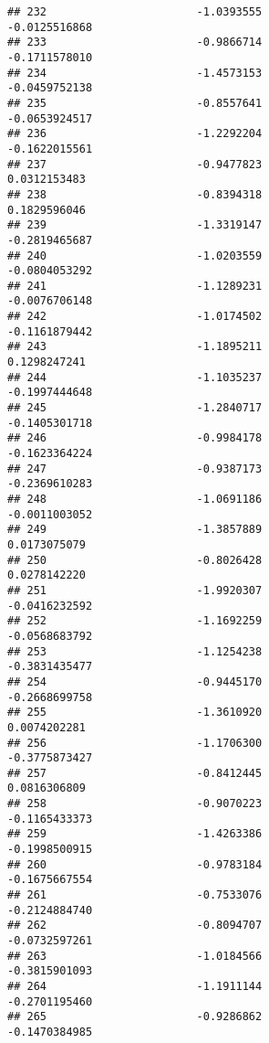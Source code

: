 \documentclass[
]{article}
\begin{document}
\begin{verbatim}
## 232                       -1.0393555                         -0.0125516868
## 233                       -0.9866714                         -0.1711578010
## 234                       -1.4573153                         -0.0459752138
## 235                       -0.8557641                         -0.0653924517
## 236                       -1.2292204                         -0.1622015561
## 237                       -0.9477823                          0.0312153483
## 238                       -0.8394318                          0.1829596046
## 239                       -1.3319147                         -0.2819465687
## 240                       -1.0203559                         -0.0804053292
## 241                       -1.1289231                         -0.0076706148
## 242                       -1.0174502                         -0.1161879442
## 243                       -1.1895211                          0.1298247241
## 244                       -1.1035237                         -0.1997444648
## 245                       -1.2840717                         -0.1405301718
## 246                       -0.9984178                         -0.1623364224
## 247                       -0.9387173                         -0.2369610283
## 248                       -1.0691186                         -0.0011003052
## 249                       -1.3857889                          0.0173075079
## 250                       -0.8026428                          0.0278142220
## 251                       -1.9920307                         -0.0416232592
## 252                       -1.1692259                         -0.0568683792
## 253                       -1.1254238                         -0.3831435477
## 254                       -0.9445170                         -0.2668699758
## 255                       -1.3610920                          0.0074202281
## 256                       -1.1706300                         -0.3775873427
## 257                       -0.8412445                          0.0816306809
## 258                       -0.9070223                         -0.1165433373
## 259                       -1.4263386                         -0.1998500915
## 260                       -0.9783184                         -0.1675667554
## 261                       -0.7533076                         -0.2124884740
## 262                       -0.8094707                         -0.0732597261
## 263                       -1.0184566                         -0.3815901093
## 264                       -1.1911144                         -0.2701195460
## 265                       -0.9286862                         -0.1470384985

\end{verbatim}
\end{document}
